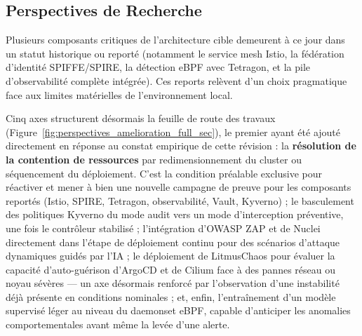 \subsection{Perspectives de Recherche}

Plusieurs composants critiques de l'architecture cible demeurent à ce jour dans un statut historique ou reporté (notamment le service mesh Istio, la fédération d'identité SPIFFE/SPIRE, la détection eBPF avec Tetragon, et la pile d'observabilité complète intégrée). Ces reports relèvent d'un choix pragmatique face aux limites matérielles de l'environnement local.

Cinq axes structurent désormais la feuille de route des travaux (Figure~\ref{fig:perspectives_amelioration_full_sec}), le premier ayant été ajouté directement en réponse au constat empirique de cette révision : la \textbf{résolution de la contention de ressources} par redimensionnement du cluster ou séquencement du déploiement. C'est la condition préalable exclusive pour réactiver et mener à bien une nouvelle campagne de preuve pour les composants reportés (Istio, SPIRE, Tetragon, observabilité, Vault, Kyverno) ; le basculement des politiques Kyverno du mode audit vers un mode d'interception préventive, une fois le contrôleur stabilisé ; l'intégration d'OWASP ZAP et de Nuclei directement dans l'étape de déploiement continu pour des scénarios d'attaque dynamiques guidés par l'IA ; le déploiement de LitmusChaos pour évaluer la capacité d'auto-guérison d'ArgoCD et de Cilium face à des pannes réseau ou noyau sévères — un axe désormais renforcé par l'observation d'une instabilité déjà présente en conditions nominales ; et, enfin, l'entraînement d'un modèle supervisé léger au niveau du daemonset eBPF, capable d'anticiper les anomalies comportementales avant même la levée d'une alerte.

